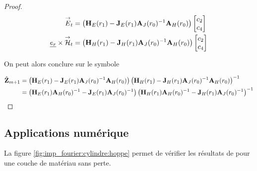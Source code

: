 \begin{proof}
            \begin{align}
                {\overset{\rightarrow}{E}}_t &= 
                \left(\mathbf{H}_{E}(r_1) - \mathbf{J}_{E}(r_1)\mathbf{A}_{J}(r_0)^{-1}\mathbf{A}_{H}(r_0)\right)
                \begin{bmatrix}
                    c_2 \\
                    c_4
                \end{bmatrix}
                \\
                \underline{e_r}\times{\overset{\rightarrow}{\mathcal{H}}}_t &= 
                \left(\mathbf{H}_{H}(r_1) - \mathbf{J}_{H}(r_1)\mathbf{A}_{J}(r_0)^{-1}\mathbf{A}_{H}(r_0) \right)
                \begin{bmatrix}
                    c_2 \\
                    c_4
                \end{bmatrix}
            \end{align}


            On peut alors conclure sur le symbole

            \begin{align}
                \hat {\mathbf{Z}}_{m+1} &= 
                \left(\mathbf{H}_{E}(r_1) - \mathbf{J}_{E}(r_1)\mathbf{A}_{J}(r_0)^{-1}\mathbf{A}_{H}(r_0)\right)
                \left(\mathbf{H}_{H}(r_1) - \mathbf{J}_{H}(r_1)\mathbf{A}_{J}(r_0)^{-1}\mathbf{A}_{H}(r_0)\right)^{-1}
                \\
                &=
                \left(\mathbf{H}_{E}(r_1)\mathbf{A}_{H}(r_0)^{-1} - \mathbf{J}_{E}(r_1)\mathbf{A}_{J}(r_0)^{-1}\right)
                \left(\mathbf{H}_{H}(r_1)\mathbf{A}_{H}(r_0)^{-1} - \mathbf{J}_{H}(r_1)\mathbf{A}_{J}(r_0)^{-1}\right)^{-1}
            \end{align}

        \end{proof}

    \subsection{Applications numérique}

        La figure \ref{fig:imp_fourier:cylindre:hoppe} permet de vérifier les résultats de \cite[p.~62]{hoppe_impedance_1995} pour une couche de matériau sans perte.


